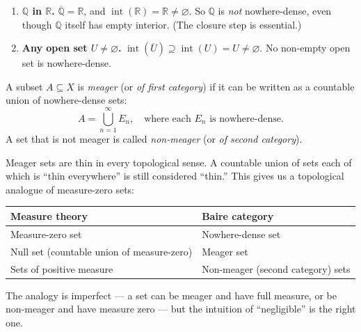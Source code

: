 \begin{example}
\label{ex:not-nowhere-dense}
\begin{enumerate}[label=(\alph*)]
  \item \textbf{$\mathbb{Q}$ in $\mathbb{R}$.}
        $\overline{\mathbb{Q}} = \mathbb{R}$, and
        $\operatorname{int}(\mathbb{R}) = \mathbb{R} \neq \varnothing$.
        So $\mathbb{Q}$ is \emph{not} nowhere-dense,
        even though $\mathbb{Q}$ itself has empty interior.
        (The closure step is essential.)

  \item \textbf{Any open set $U \neq \varnothing$.}
        $\operatorname{int}(\overline{U}) \supseteq \operatorname{int}(U) = U \neq \varnothing$.
        No non-empty open set is nowhere-dense.
\end{enumerate}
\end{example}

\begin{tcolorbox}[colback=propbox, colframe=propborder, arc=2pt,
  left=6pt, right=6pt, top=4pt, bottom=4pt,
  title={\small\textbf{Definition (Meager / First Category)}},
  fonttitle=\small\bfseries]
\begin{definition}
\label{def:meager}
A subset $A \subseteq X$ is \emph{meager} (or \emph{of first category})
if it can be written as a countable union of nowhere-dense sets:
\[
A = \bigcup_{n=1}^{\infty} E_n,
\quad \text{where each } E_n \text{ is nowhere-dense.}
\]
A set that is not meager is called \emph{non-meager} (or
\emph{of second category}).
\end{definition}
\end{tcolorbox}

\begin{remark*}
Meager sets are thin in every topological sense.
A countable union of sets each of which is ``thin everywhere'' is
still considered ``thin.''
This gives us a topological analogue of measure-zero sets:
\begin{center}
\begin{tabular}{l l}
\toprule
\textbf{Measure theory} & \textbf{Baire category} \\
\midrule
Measure-zero set & Nowhere-dense set \\
Null set (countable union of measure-zero) & Meager set \\
Sets of positive measure & Non-meager (second category) sets \\
\bottomrule
\end{tabular}
\end{center}
The analogy is imperfect --- a set can be meager and have full measure,
or be non-meager and have measure zero --- but the intuition of
``negligible'' is the right one.
\end{remark*}

